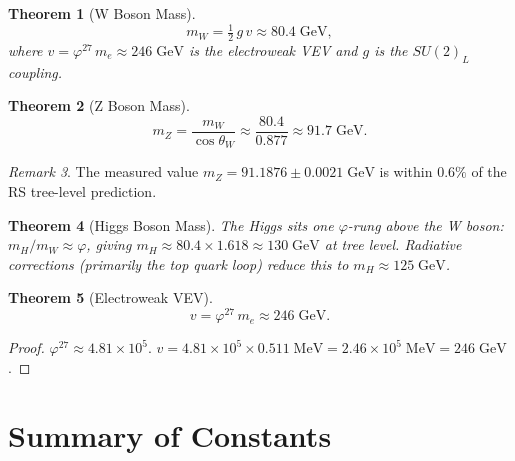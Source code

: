 \documentclass[12pt,a4paper]{article}
\newtheorem{theorem}{Theorem}[section]
\theoremstyle{definition}
\theoremstyle{remark}
\newtheorem{remark}[theorem]{Remark}
\begin{document}
\begin{theorem}[W Boson Mass]
\label{thm:mW}
\begin{equation}
  m_W = \tfrac{1}{2}\,g\,v \approx 80.4\;\mathrm{GeV},
\end{equation}
where $v = \varphi^{27}\,m_e \approx 246\;\mathrm{GeV}$ is the
electroweak VEV and $g$ is the $SU(2)_L$ coupling.
\end{theorem}

\begin{theorem}[Z Boson Mass]
\label{thm:mZ}
\begin{equation}
  m_Z = \frac{m_W}{\cos\theta_W}
  \approx \frac{80.4}{0.877} \approx 91.7\;\mathrm{GeV}.
\end{equation}
\end{theorem}

\begin{remark}
The measured value $m_Z = 91.1876 \pm 0.0021\;\mathrm{GeV}$ is
within $0.6\%$ of the RS tree-level prediction.
\end{remark}

\begin{theorem}[Higgs Boson Mass]
\label{thm:mH}
The Higgs sits one $\varphi$-rung above the W boson:
$m_H/m_W \approx \varphi$, giving
$m_H \approx 80.4 \times 1.618 \approx 130\;\mathrm{GeV}$
at tree level.  Radiative corrections (primarily the top quark
loop) reduce this to $m_H \approx 125\;\mathrm{GeV}$.
\end{theorem}

\begin{theorem}[Electroweak VEV]
\label{thm:vev}
\begin{equation}
  v = \varphi^{27}\,m_e \approx 246\;\mathrm{GeV}.
\end{equation}
\end{theorem}

\begin{proof}
$\varphi^{27} \approx 4.81 \times 10^5$.
$v = 4.81 \times 10^5 \times 0.511\;\mathrm{MeV}
= 2.46 \times 10^5\;\mathrm{MeV} = 246\;\mathrm{GeV}$.
\end{proof}

\section{Summary of Constants}
\label{sec:summary}
\end{document}
